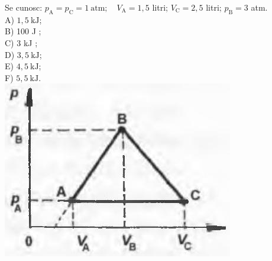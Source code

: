 \documentclass[10pt]{article}
\begin{document}
Se cunosc: $p_{\mathrm{A}}=p_{\mathrm{C}}=1 \mathrm{~atm} ; \quad V_{\mathrm{A}}=1,5$ litri; $V_{\mathrm{C}}=2,5$ litri; $p_{\mathrm{B}}=3$ atm.\\
A) $1,5 \mathrm{~kJ}$;\\
B) 100 J ;\\
C) 3 kJ ;\\
D) $3,5 \mathrm{~kJ}$;\\
E) $4,5 \mathrm{~kJ}$;\\
F) $5,5 \mathrm{~kJ}$.\\
\includegraphics[max width=\textwidth, center]{2025_07_01_5b3ff9fa0d508c8e9f17g-097}
\end{document}
